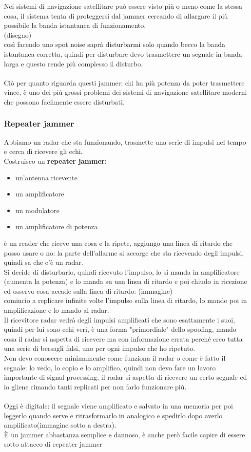 \documentclass[oneside, 12pt]{extbook}
\begin{document}
Nei sistemi di navigazione satellitare può essere visto più o meno come la stessa cosa, il sistema tenta di proteggersi dal jammer cercando di allargare il più possibile la banda istantanea di funzionamento.\\
(disegno)\\
così facendo uno spot noise saprà disturbarmi solo quando becco la banda istantanea corretta, quindi per disturbare devo trasmettere un segnale in banda larga e questo rende più complesso il disturbo.\\\\
Ciò per quanto riguarda questi jammer: chi ha più potenza da poter trasmettere vince, è uno dei più grossi problemi dei sistemi di navigazione satellitare moderni che possono facilmente essere disturbati.

\subsubsection{Repeater jammer}
Abbiamo un radar che sta funzionando, trasmette una serie di impulsi nel tempo e cerca di ricevere gli echi.\\
Costruisco un \textbf{repeater jammer:}
\begin{itemize}
	\item un'antenna ricevente
	\item un amplificatore
	\item un modulatore
	\item un amplificatore di potenza
\end{itemize}
è un reader che riceve una cosa e la ripete, aggiungo una linea di ritardo che posso usare o no: la parte dell'allarme si accorge che sta ricevendo degli impulsi, quindi sa che c'è un radar.\\
Si decide di disturbarlo, quindi ricevuto l'impulso, lo si manda in amplificatore (aumenta la potenza) e lo manda su una linea di ritardo e poi chiudo in ricezione ed osservo cosa accade sulla linea di ritardo: (immagine)\\
comincio a replicare infinite volte l'impulso sulla linea di ritardo, lo mando poi in amplificazione e lo mando al radar.\\
Il ricevitore radar vedrà degli impulsi amplificati che sono esattamente i suoi, quindi per lui sono echi veri, è una forma "primordiale" dello spoofing, mando cosa il radar si aspetta di ricevere ma con informazione errata perché creo tutta una serie di bersagli falsi, uno per ogni impulso che ho ripetuto.\\
Non devo conoscere minimamente come funziona il radar o come è fatto il segnale: lo vedo, lo copio e lo amplifico, quindi non devo fare un lavoro importante di signal processing, il radar si aspetta di ricevere un certo segnale ed io gliene rimando tanti replicati per non farlo funzionare più.\\\\
Oggi è digitale: il segnale viene amplificato e salvato in una memoria per poi leggerlo quando serve e ritrasformarlo in analogico e spedirlo dopo averlo amplificato(immagine sotto a destra).\\
È un jammer abbastanza semplice e dannoso, è anche però facile capire di essere sotto attacco di repeater jammer
\end{document}
